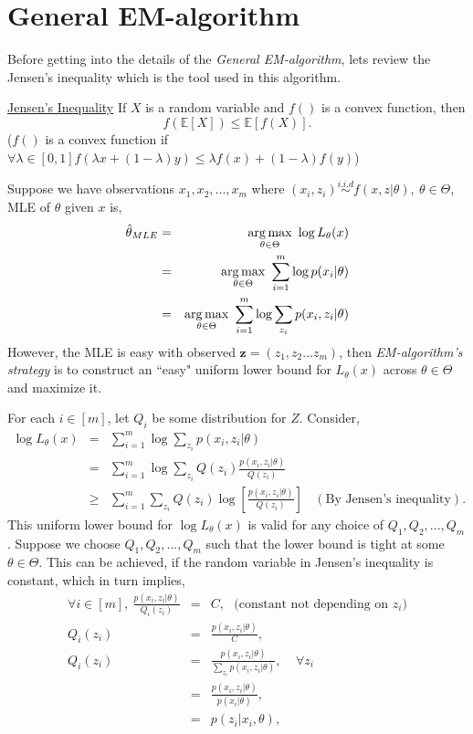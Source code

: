 \documentclass[a4paper,english,12pt]{article}
\begin{document}
\section{General EM-algorithm}
Before getting into the details of the \textit{General EM-algorithm}, lets review the Jensen's inequality which is the tool used in this algorithm.\\
\begin{defn}{\underline{Jensen's Inequality}}
If $X$ is a random variable and $f()$ is a convex function, then 
\begin{equation*}
f(\mathbb{E}[X])\leq \mathbb{E}[f(X)].
\end{equation*} 
($f()$ is a convex function if $\forall \lambda \in [0,1] f(\lambda x + (1-\lambda)y)\leq\lambda f(x)+(1-\lambda)f(y)$)
\end{defn}
Suppose we have observations $x_1, x_2,...,x_m$ where $(x_i,z_i) \overset{i.i.d}{\sim} f(x,z|\theta),~\theta \in \Theta$, MLE of $\theta$ given $x$ is,
\begin{eqnarray*}
\hat{\theta}_{MLE} &=& \operatorname*{arg\,max}_{\theta \in \Theta} ~\log L_\theta (x)\\
&=& \operatorname*{arg\,max}_{\theta \in \Theta} ~\sum\limits_{i=1}^m\log p(x_i|\theta)\\
&=& \operatorname*{arg\,max}_{\theta \in \Theta} ~\sum\limits_{i=1}^m\log \sum\limits_{z_i}p(x_i,z_i|\theta)
\end{eqnarray*}
However, the MLE is easy with observed $\textbf{z}=(z_1, z_2...z_m)$, then \textit{EM-algorithm's strategy} is to construct an ``easy" uniform lower bound for $L_\theta (x)$ across $\theta \in \Theta$ and maximize it. 
\par For each $i \in [m]$, let $Q_i$ be some distribution for $Z$. Consider,
\begin{eqnarray*}
\log L_\theta (x) &=&\sum\limits_{i=1}^m\log \sum\limits_{z_i}p(x_i,z_i|\theta)\\
&=&\sum\limits_{i=1}^m\log \sum\limits_{z_i}Q(z_i)\frac{p(x_i,z_i|\theta)}{Q(z_i)}\\
&\geq &\sum\limits_{i=1}^m \sum\limits_{z_i}Q(z_i)\log \left[ \frac{p(x_i,z_i|\theta)}{Q(z_i)} \right] ~~~~(\text{By Jensen's inequality}).
\end{eqnarray*}
This uniform lower bound for $\log L_\theta (x)$ is valid for any choice of $Q_1, Q_2,...,Q_m$. Suppose we choose $Q_1, Q_2,...,Q_m$ such that the lower bound is tight at some $\theta \in \Theta$. This can be achieved, if the random variable in Jensen's inequality is constant, which in turn implies,  
\begin{eqnarray*}
\forall i \in [m ], ~\frac{p(x_i,z_i|\theta)}{Q_i(z_i)} &=& C, ~~~\text{(constant not depending on $z_i$)} \\
Q_i(z_i) &=& \frac{p(x_i,z_i|\theta)}{C},\\
Q_i(z_i) &=& \frac{p(x_i,z_i|\theta)}{\sum\limits_{z_i}p(x_i,z_i|\theta)},~~~~~\forall z_i\\
&=& \frac{p(x_i,z_i|\theta)}{p(x_i|\theta)},\\
&=& p(z_i|x_i,\theta),
\end{eqnarray*}
\end{document}
